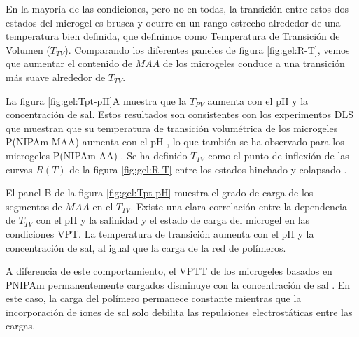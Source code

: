 En la mayor\'ia de las condiciones, pero no en todas, la transici\'on entre estos dos estados del microgel es brusca y ocurre en un rango estrecho alrededor de una temperatura bien definida, que definimos como Temperatura de Transici\'on de Volumen ($T_{TV}$).
Comparando los diferentes paneles de figura \ref{fig:gel:R-T}, vemos que aumentar el contenido de $MAA$ de los microgeles conduce a una transici\'on m\'as suave alrededor de $T_{TV}$.



La figura \ref{fig:gel:Tpt-pH}A muestra que la $T_{PV}$ aumenta con el pH y la concentraci\'on de sal.
Estos resultados son consistentes con los experimentos DLS que muestran que su temperatura de transici\'on volum\'etrica de los microgeles P(NIPAm-MAA) aumenta con el pH \cite{Kleinen2008}, lo que tambi\'en se ha observado para los microgeles P(NIPAm-AA) \cite{CaprilesGonzalez2008}.
Se ha definido $T_{TV}$ como el punto de inflexi\'on de las curvas $R(T)$ de la figura \ref{fig:gel:R-T} entre los estados hinchado y colapsado \cite{Kratz2001}.


El panel B de la figura \ref{fig:gel:Tpt-pH} muestra el grado de carga de los segmentos de $MAA$ en el $T_{TV}$.
Existe una clara correlaci\'on entre la dependencia de $T_{TV}$ con el pH y la salinidad y el estado de carga del microgel en las condiciones VPT.
La temperatura de transici\'on aumenta con el pH y la concentraci\'on de sal, al igual que la carga de la red de pol\'imeros.

A diferencia de este comportamiento, el VPTT de los microgeles basados en PNIPAm permanentemente cargados disminuye con la concentraci\'on de sal \cite{Lopez2020}.
En este caso, la carga del pol\'imero permanece constante mientras que la incorporaci\'on de iones de sal solo debilita las repulsiones electrost\'aticas entre las cargas.


